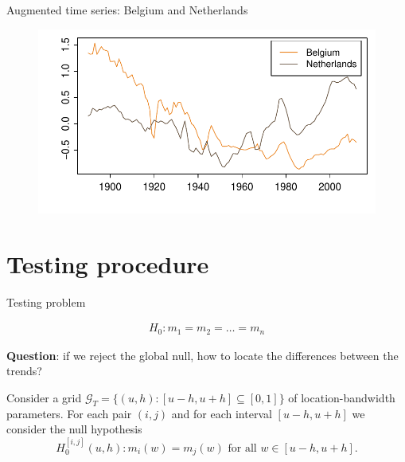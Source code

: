 \documentclass[10pt, handout]{beamer}
\begin{document}
\begin{frame}{Augmented time series: Belgium and Netherlands}
	\begin{figure}
    		\centering
    		\includegraphics[height=0.65\textheight]{plots/hp_BEL_NLD_adj.pdf}
  	\end{figure}	
\end{frame}

\section{Testing procedure}

\begin{frame}{Testing problem}

\begin{align*}
H_0: m_1 = m_2 = \ldots = m_n
\end{align*}\pause

\vspace{-4mm}
\textbf{Question}: if we reject the global null, how to locate the differences between the trends? \pause

Consider a grid $\mathcal{G}_T = \{(u, h): [u-h, u+h] \subseteq [0, 1]\}$ of location-bandwidth parameters. \pause For each pair $(i, j)$ and for each interval $[u-h, u+h]$ we consider the null hypothesis 
\[ H_0^{[i,j]}(u,h): m_i(w) = m_j(w) \text{ for all } w \in [u-h,u+h]. \]\pause
\end{frame}
\end{document}
